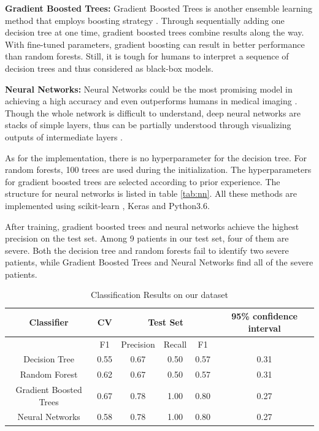 \textbf{Gradient Boosted Trees:} Gradient Boosted Trees is another ensemble learning method that employs boosting strategy \citep{gbtrees}. Through sequentially adding one decision tree at one time, gradient boosted trees combine results along the way. With fine-tuned parameters, gradient boosting can result in better performance than random forests. Still, it is tough for humans to interpret a sequence of decision trees and thus considered as black-box models.

\textbf{Neural Networks:} Neural Networks could be the most promising model in achieving a high accuracy and even outperforms humans in medical imaging \citep{maier2018gentle}. Though the whole network is difficult to understand, deep neural networks are stacks of simple layers, thus can be partially understood through visualizing outputs of intermediate layers \citep{Montavon_2018}.


As for the implementation, there is no hyperparameter for the decision tree. For random forests, 100 trees are used during the initialization. The hyperparameters for gradient boosted trees are selected according to prior experience. The structure for neural networks is listed in table \ref{tab:nn}. All these methods are implemented using scikit-learn \citep{scikit-learn}, Keras and Python3.6.

After training, gradient boosted trees and neural networks achieve the highest precision on the test set. Among 9 patients in our test set, four of them are severe. Both the decision tree and random forests fail to identify two severe patients, while Gradient Boosted Trees and Neural Networks find all of the severe patients. 


\begin{table}[H]
\centering
\begin{tabular}{cccccc}
\toprule
Classifier    & CV & \multicolumn{3}{c}{Test Set} & 95\% confidence interval \\ \midrule
                        & F1     & Precision  & Recall  & F1    &\\
Decision Tree           & 0.55   & 0.67       & 0.50    & 0.57  & 0.31\\
Random Forest           & 0.62   & 0.67       & 0.50    & 0.57  & 0.31\\
Gradient Boosted Trees  & 0.67   & 0.78       & 1.00    & 0.80  & 0.27\\
Neural Networks         & 0.58   & 0.78       & 1.00    & 0.80  & 0.27\\ \bottomrule
\end{tabular}
\caption{Classification Results on our dataset}
\end{table}

